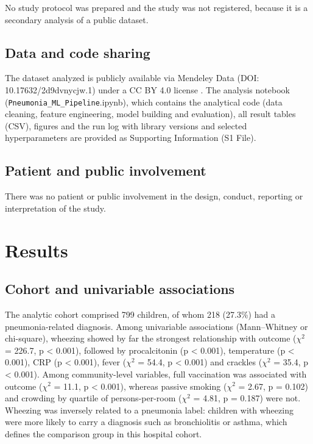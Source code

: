 \documentclass[a4paper,fleqn]{cas-dc}
\begin{document}
No study protocol was prepared and the study was not registered, because it is a secondary analysis of a public dataset.

\subsection{Data and code sharing}

The dataset analyzed is publicly available via Mendeley Data (DOI: 10.17632/2d9dvnycjw.1) under a CC BY 4.0 license \cite{r15}. The analysis notebook (\texttt{Pneumonia\_\allowbreak ML\_\allowbreak Pipeline}.ipynb), which contains the analytical code (data cleaning, feature engineering, model building and evaluation), all result tables (CSV), figures and the run log with library versions and selected hyperparameters are provided as Supporting Information (S1 File).

\subsection{Patient and public involvement}

There was no patient or public involvement in the design, conduct, reporting or interpretation of the study.

\section{Results}
\label{sec:res}

\subsection{Cohort and univariable associations}
\label{sec:cohort}

The analytic cohort comprised 799 children, of whom 218 (27.3\%) had a pneumonia-related diagnosis. Among univariable associations (Mann--Whitney or chi-square), wheezing showed by far the strongest relationship with outcome ($\chi$$^{2}$ = 226.7, p < 0.001), followed by procalcitonin (p < 0.001), temperature (p < 0.001), CRP (p < 0.001), fever ($\chi$$^{2}$ = 54.4, p < 0.001) and crackles ($\chi$$^{2}$ = 35.4, p < 0.001). Among community-level variables, full vaccination was associated with outcome ($\chi$$^{2}$ = 11.1, p < 0.001), whereas passive smoking ($\chi$$^{2}$ = 2.67, p = 0.102) and crowding by quartile of persons-per-room ($\chi$$^{2}$ = 4.81, p = 0.187) were not. Wheezing was inversely related to a pneumonia label: children with wheezing were more likely to carry a diagnosis such as bronchiolitis or asthma, which defines the comparison group in this hospital cohort.
\end{document}
